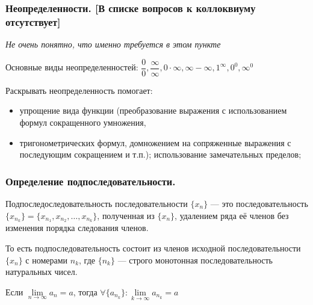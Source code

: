 \documentclass[12pt, a4paper]{article}
\begin{document}
	\subsubsection{Неопределенности. [В списке вопросов к коллоквиуму отсутствует]} 
	\emph{Не очень понятно, что именно требуется в этом пункте}
	
	Основные виды неопределенностей: $\dfrac{0}{0}, \dfrac{\infty}{\infty}, 0 \cdot \infty, \infty - \infty, 1^{\infty}, 0^0, \infty^0$

	Раскрывать неопределенность помогает:
	\begin{itemize}
		\item
		упрощение вида функции (преобразование выражения с использованием формул сокращенного умножения, 

		\item
		тригонометрических формул, домножением на сопряженные выражения с последующим сокращением и т.п.);
		использование замечательных пределов;
	\end{itemize}	

	\subsubsection{Определение подпоследовательности.} 
	Подпоследоследовательность последовательности $\{x_n\}$ --- это последовательность $\{x_{n_k}\} = \{x_{n_1}, x_{n_2}, \dots, x_{n_k}\}$, полученная из $\{x_n\}$, удалением ряда её членов без изменения порядка следования членов. 

	То есть подпоследовательность состоит из членов исходной последовательности $\{x_n\}$ с номерами $n_k$, где $\{n_k\}$ --- строго монотонная последовательность натуральных чисел. 

	\begin{remark}
		Если $\lim\limits_{n \to \infty} a_n = a$, тогда $\forall \{a_{n_k}\}: \lim\limits_{k \to \infty} a_{n_k} = a$
	\end{remark}
\end{document}
